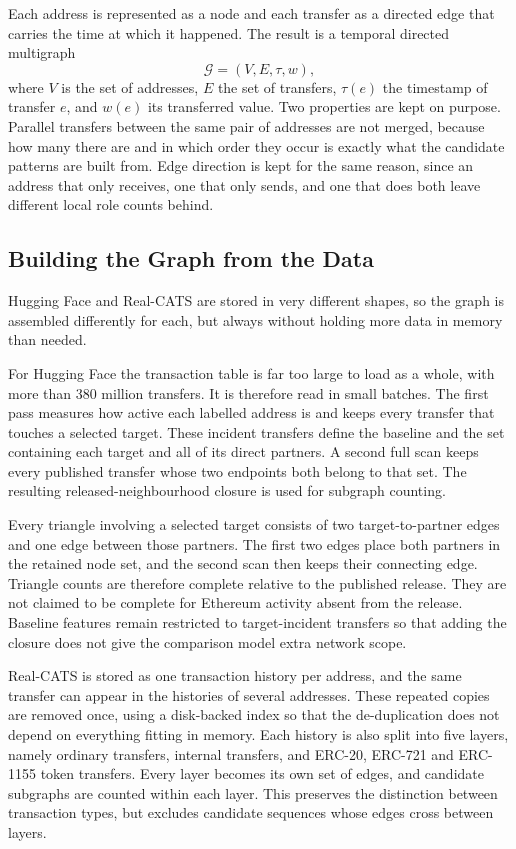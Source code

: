 \documentclass{thesisclass}
\begin{document}
Each address is represented as a node and each transfer as a directed edge that
carries the time at which it happened. The result is a temporal directed
multigraph
\[
  \mathcal{G}=(V,E,\tau,w),
\]
where $V$ is the set of addresses, $E$ the set of transfers, $\tau(e)$ the
timestamp of transfer $e$, and $w(e)$ its transferred value. Two properties are
kept on purpose. Parallel transfers between the same pair of addresses are not
merged, because how many there are and in which order they occur is exactly what
the candidate patterns are built from. Edge direction is kept for the same reason, since an
address that only receives, one that only sends, and one that does both leave
different local role counts behind.

\subsection{Building the Graph from the Data}

Hugging Face and Real-CATS are stored in very different shapes, so the graph is
assembled differently for each, but always without holding more data in memory
than needed.

For Hugging Face the transaction table is far too large to load as a whole, with
more than 380 million transfers. It is therefore read in small batches. The
first pass measures how active each labelled address is and keeps every transfer
that touches a selected target. These incident transfers define the baseline and
the set containing each target and all of its direct partners. A second full
scan keeps every published transfer whose two endpoints both belong to that set.
The resulting released-neighbourhood closure is used for subgraph counting.

Every triangle involving a selected target consists of two target-to-partner
edges and one edge between those partners. The first two edges place both
partners in the retained node set, and the second scan then keeps their connecting
edge. Triangle counts are therefore complete relative to the published release.
They are not claimed to be complete for Ethereum activity absent from the
release. Baseline features remain restricted to target-incident transfers so
that adding the closure does not give the comparison model extra network scope.

Real-CATS is stored as one transaction history per address, and the same
transfer can appear in the histories of several addresses. These repeated copies
are removed once, using a disk-backed index so that the de-duplication does not
depend on everything fitting in memory. Each history is also split into five
layers, namely ordinary transfers, internal transfers, and ERC-20, ERC-721 and
ERC-1155 token transfers. Every layer becomes its own set of edges, and candidate subgraphs
are counted within each layer. This preserves the distinction between transaction
types, but excludes candidate sequences whose edges cross between layers.
\end{document}
